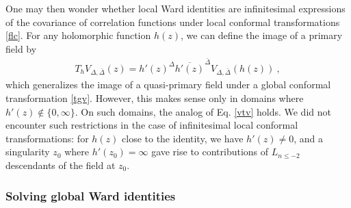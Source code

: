 \documentclass[12pt, a4paper, notitlepage, twoside]{report}
\numberwithin{equation}{section}
\theoremstyle{break}
\begin{document}
One may then wonder whether local Ward identities are infinitesimal expressions of the covariance of correlation functions under local conformal transformations \eqref{flc}.
For any holomorphic function $h(z)$, we can define the image of a primary field by
\begin{align}
 T_h V_{\Delta,\bar\Delta}(z) = h'(z)^{\Delta}\overline{h'(z)}^{\bar \Delta}V_{\Delta,\bar\Delta}(h(z))\ ,
\label{thv}
\end{align}
which generalizes the image of a quasi-primary field under a global conformal transformation \eqref{tgv}.
However, this makes sense only in domains where $h'(z)\notin \{0, \infty\}$. On such domains, the analog of Eq. \eqref{vtv} holds. We did not encounter such restrictions in the case of infinitesimal local conformal transformations: for $h(z)$ close to the identity, we have $h'(z)\neq 0$, and a singularity $z_0$ where $h'(z_0)=\infty$ gave rise to contributions of $L_{n\leq -2}$ descendants of the field at $z_0$.


\subsubsection{Solving global Ward identities}
\end{document}
